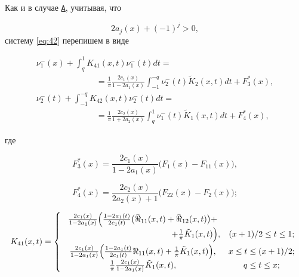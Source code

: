 Как и в случае \hyperlink{abd:A}{\tt A}, учитывая, что 

$$2{a_j}(x) + {( - 1)^j} > 0,$$ систему \eqref{eq:42}  перепишем в виде

\begin{equation}

\begin{array}{l}

\displaystyle

\nu _1^ - (x) +  \int _q^1 {{K_{41}}(x,t)\nu _1^ - (t)dt} =\\

\displaystyle

\hspace{3cm}

  = \frac{1}{\pi }\frac{{2{c_1}(x)}}{{1 - 2{a_1}(x)}} \int _{ - 1}^{ - q} {\nu _2^ - (t){{\tilde K}_2}(x,t)dt}  + F_3^ * (x),\\

\displaystyle

\nu _2^ - (t) +  \int _{ - 1}^{ - q} {{K_{42}}(x,t)\nu _2^ - (t)dt} =

\\

\displaystyle

\hspace{3cm}

  = \frac{1}{\pi }\frac{{2{c_2}(x)}}{{1 + 2{a_2}(x)}} \int _q^1 {\nu _1^ - (t){{\tilde K}_1}(x,t)dt}  + F_4^*(x),

\end{array}   \label{eq:43}

\end{equation}

где 

$$F_3^ * (x) = \frac{{2{c_1}(x)}}{{1 - 2{a_1}(x)}}\bigl( {{F_1}(x) - {F_{11}}(x)} \bigr),$$ 

$$F_4^ * (x) = \frac{{2{c_2}(x)}}{{2{a_2}(x) + 1}}\bigl( {{F_{22}}(x) - {F_2}(x)} \bigr);$$

$${K_{41}}(x,t) = \left\{ 

\begin{array}{cc}

\frac{{2{c_1}(x)}}{{1 - 2{a_1}(x)}}

\Bigl( \frac{{1 - 2{a_1}(t)}}{{2{c_1}(t)}} 

\bigl( {{\bar \Re }_{11}}(x,t) + {{\bar \Re }_{12}}(x,t) \bigr) +

\\

\hspace{4.5cm} 

 + \frac{1}{\pi }{{\tilde K}_1}(x,t) \Bigr), &({{x + 1}})/{2} \le t \le 1;

 \\[2mm]

\frac{{2{c_1}(x)}}{{1 - 2{a_1}(x)}}\Bigl( \frac{{1 - 2{a_1}(t)}}{{2{c_1}(t)}} {\Re _{11}}(x,t) + \frac{1}{\pi }{{\tilde K}_1}(x,t) \Bigr), & x \le t \le ({{x + 1}})/{2};\\

\frac{1}{\pi } \frac{{2{c_1}(x)}}{{1 - 2{a_1}(x)}}  {{\tilde K}_1}(x,t), & q \le t \le x;

\end{array} \right.$$

